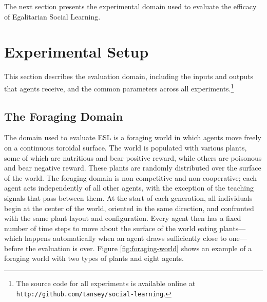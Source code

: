 \documentclass{sig-alternate}
\begin{document}


The next section presents the experimental domain used to evaluate the efficacy of Egalitarian Social Learning.

\section{Experimental Setup}
\label{sec:setup}
This section describes the evaluation domain, including the inputs and outputs that agents receive, and the common parameters across all experiments.\footnote{The source code for all experiments is available online at \texttt{http://github.com/tansey/social-learning}.}

\subsection{The Foraging Domain}
The domain used to evaluate ESL is a foraging world in which agents move freely on a continuous toroidal surface. The world is populated with various plants, some of which are nutritious and bear positive reward, while others are poisonous and bear negative reward. These plants are randomly distributed over the surface of the world. The foraging domain is non-competitive and non-cooperative; each agent acts independently of all other agents, with the exception of the teaching signals that pass between them. At the start of each generation, all individuals begin at the center of the world, oriented in the same direction, and confronted with the same plant layout and configuration. Every agent then has a fixed number of time steps to move about the surface of the world eating plants--- which happens automatically when an agent draws sufficiently close to one--- before the evaluation is over. Figure \ref{fig:foraging-world} shows an example of a foraging world with two types of plants and eight agents.
\end{document}
